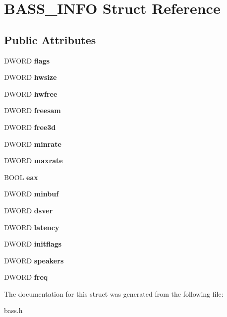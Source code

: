 \section{B\+A\+S\+S\+\_\+\+I\+N\+F\+O Struct Reference}
\label{struct_b_a_s_s___i_n_f_o}
\subsection*{Public Attributes}
\begin{DoxyCompactItemize}
\item 
D\+W\+O\+R\+D {\bfseries flags}\label{struct_b_a_s_s___i_n_f_o_acc4ee63d143d96b60e96fe55ad66d151}

\item 
D\+W\+O\+R\+D {\bfseries hwsize}\label{struct_b_a_s_s___i_n_f_o_a41c357da1c1d00b688c237719acb668b}

\item 
D\+W\+O\+R\+D {\bfseries hwfree}\label{struct_b_a_s_s___i_n_f_o_a2e7b2bdba56ca19846702cc2251dceaf}

\item 
D\+W\+O\+R\+D {\bfseries freesam}\label{struct_b_a_s_s___i_n_f_o_a1ec0d1abc45e959efd8324a729108eca}

\item 
D\+W\+O\+R\+D {\bfseries free3d}\label{struct_b_a_s_s___i_n_f_o_a04951fd8ee77cdf358ae897e64318f51}

\item 
D\+W\+O\+R\+D {\bfseries minrate}\label{struct_b_a_s_s___i_n_f_o_ae98cb552509ca0cf8a6f034544ad9523}

\item 
D\+W\+O\+R\+D {\bfseries maxrate}\label{struct_b_a_s_s___i_n_f_o_a770602ac32b59b0b563da64276e8110e}

\item 
B\+O\+O\+L {\bfseries eax}\label{struct_b_a_s_s___i_n_f_o_adab4375ade13fe88510db582bd3c919f}

\item 
D\+W\+O\+R\+D {\bfseries minbuf}\label{struct_b_a_s_s___i_n_f_o_a855c6df53310491802f018736e81dac4}

\item 
D\+W\+O\+R\+D {\bfseries dsver}\label{struct_b_a_s_s___i_n_f_o_af8cabba039215c378dd6fd6ef0bf8e9f}

\item 
D\+W\+O\+R\+D {\bfseries latency}\label{struct_b_a_s_s___i_n_f_o_ab54c862f3f10d31df27541c83682c883}

\item 
D\+W\+O\+R\+D {\bfseries initflags}\label{struct_b_a_s_s___i_n_f_o_a7c73adb1a84b1c7b2af2da81694e24da}

\item 
D\+W\+O\+R\+D {\bfseries speakers}\label{struct_b_a_s_s___i_n_f_o_a5b563d324e9551ab98ce9888c5277f72}

\item 
D\+W\+O\+R\+D {\bfseries freq}\label{struct_b_a_s_s___i_n_f_o_a72d42df53abce9b0fd676aa220b377ad}

\end{DoxyCompactItemize}


The documentation for this struct was generated from the following file\+:\begin{DoxyCompactItemize}
\item 
bass.\+h\end{DoxyCompactItemize}
